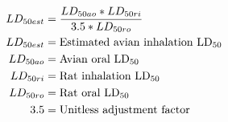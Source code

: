 \documentclass[fleqn, oneside, 11pt]{article}%
\begin{document}
\begin{preview}
\begin{align*}%
LD_{50est} & = \frac{LD_{50ao}*LD_{50ri}}{3.5*LD_{50ro}}\nonumber \\
LD_{50est} & =  \text{Estimated avian inhalation LD\textsubscript{50}} \nonumber \\
LD_{50ao} & =  \text{Avian oral LD\textsubscript{50}} \nonumber \\
LD_{50ri} & =  \text{Rat inhalation LD\textsubscript{50}} \nonumber \\
LD_{50ro} & =  \text{Rat oral LD\textsubscript{50}} \nonumber \\
3.5 & =  \text{Unitless adjustment factor} \nonumber \\
\end{align*} 
\end{preview}
\end{document}
